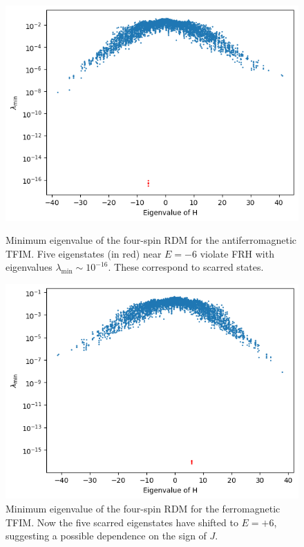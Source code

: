 \documentclass{article}
\begin{document}
\begin{figure}[h]
    \centering
    \begin{minipage}{0.45\textwidth}
        \centering
        \includegraphics[width=\linewidth]{4spins.png}
        \caption{Minimum eigenvalue of the four-spin RDM for the antiferromagnetic TFIM. Five eigenstates (in red) near $E = -6$ violate FRH with eigenvalues $\lambda_{\min} \sim 10^{-16}$. These correspond to scarred states.}
        \label{fig:4spins_anti}
    \end{minipage}\hfill
    \begin{minipage}{0.45\textwidth}
        \centering
        \includegraphics[width=\linewidth]{4spins-ferro.png}
        \caption{Minimum eigenvalue of the four-spin RDM for the ferromagnetic TFIM. Now the five scarred eigenstates have shifted to $E = +6$, suggesting a possible dependence on the sign of $J$.}
        \label{fig:4spins_ferro}
    \end{minipage}
\end{figure}
\end{document}
